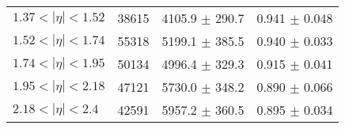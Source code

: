 \begin{tabular}{lccc}
$1.37 < |\eta| <1.52$          & 38615      & 4105.9     $\pm$ 290.7 & 0.941      $\pm$ 0.048 \\
$1.52 < |\eta| <1.74$          & 55318      & 5199.1     $\pm$ 385.5 & 0.940      $\pm$ 0.033 \\
$1.74 < |\eta| <1.95$          & 50134      & 4996.4     $\pm$ 329.3 & 0.915      $\pm$ 0.041 \\
$1.95 < |\eta| <2.18$          & 47121      & 5730.0     $\pm$ 348.2 & 0.890      $\pm$ 0.066 \\
$2.18 < |\eta| <2.4$           & 42591      & 5957.2     $\pm$ 360.5 & 0.895      $\pm$ 0.034 \\
\hline
\end{tabular}
